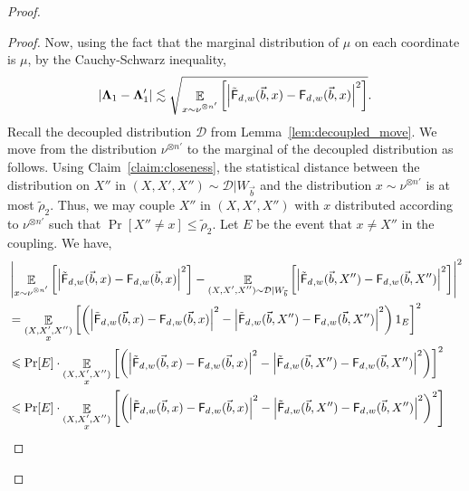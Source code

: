 \documentclass[10pt,a4paper]{amsart}
\newcommand\card[1]{\left| {#1} \right|}
\newcommand\Expect[2]{{\mathop{\mathbb{E}}_{#1}\left[ {#2} \right]}}
\renewcommand\leq{\leqslant}
\newcommand{\V}[1]{{#1}}
\begin{document}
\begin{proof}
\begin{proof}
       Now, using the fact that the marginal distribution of $\mu$ on each coordinate is $\mu$, by the Cauchy-Schwarz inequality,
      \begin{equation}\label{eq:inv_trunc_bound}
        \card{\mathbf{\Lambda}_1 -  \mathbf{\Lambda}'_1 } \lesssim \sqrt{\Expect{\substack{\V x\sim \nu^{\otimes n'}}}{\card{\truncfcoarsedecoupled_{,\V w}(\vec{b},\V x) - \fcoarsedecoupled_{,\V w}(\vec{b},\V x) }^2}}.
      \end{equation}
      Recall the decoupled distribution $\mathcal{D}$ from Lemma~\ref{lem:decoupled_move}. We move from the distribution $\nu^{\otimes n'}$ to the marginal of the decoupled distribution as follows. Using Claim~\ref{claim:closeness}, the statistical distance between the distribution on $X''$ in $(X, X', X'')\sim \mathcal{D}|W_{\vec{b}}$ and the distribution $x\sim \nu^{\otimes n'}$ is at most $\tilde{\rho}_2$. Thus, we may couple $X''$ in $(X, X', X'')$ with $x$ distributed according to $\nu^{\otimes n'}$ such that $\Pr[X''\neq x]\leq \tilde{\rho}_2$. Let $E$ be the event that $x\neq X''$ in the coupling. We have,
      \begin{align*}
          &\card{\Expect{\substack{\V x\sim \nu^{\otimes n'}}}{\card{\truncfcoarsedecoupled_{,\V w}(\vec{b},\V x) - \fcoarsedecoupled_{,\V w}(\vec{b},\V x) }^2} -\Expect{\substack{(X, X', X'')\sim \mathcal{D}|W_{\vec{b}}}}{\card{\truncfcoarsedecoupled_{,\V w}(\vec{b},\V X'') - \fcoarsedecoupled_{,\V w}(\vec{b},\V X'') }^2} }^2\\
          & = \Expect{\substack{(X, X', X'')\\\V x }}{\left(\card{\truncfcoarsedecoupled_{,\V w}(\vec{b},\V x) - \fcoarsedecoupled_{,\V w}(\vec{b},\V x) }^2 -\card{\truncfcoarsedecoupled_{,\V w}(\vec{b},\V X'') - \fcoarsedecoupled_{,\V w}(\vec{b},\V X'') }^2\right) 1_E} ^2\\
          &\leq \Pr[E]\cdot \Expect{\substack{(X, X', X'')\\\V x }}{\left(\card{\truncfcoarsedecoupled_{,\V w}(\vec{b},\V x) - \fcoarsedecoupled_{,\V w}(\vec{b},\V x) }^2 -\card{\truncfcoarsedecoupled_{,\V w}(\vec{b},\V X'') - \fcoarsedecoupled_{,\V w}(\vec{b},\V X'') }^2\right)} ^2\\
           &\leq \Pr[E]\cdot \Expect{\substack{(X, X', X'')\\\V x }}{\left(\card{\truncfcoarsedecoupled_{,\V w}(\vec{b},\V x) - \fcoarsedecoupled_{,\V w}(\vec{b},\V x) }^2 -\card{\truncfcoarsedecoupled_{,\V w}(\vec{b},\V X'') - \fcoarsedecoupled_{,\V w}(\vec{b},\V X'') }^2\right)^2}\\

\end{align*}
\end{proof}
\end{proof}
\end{document}
